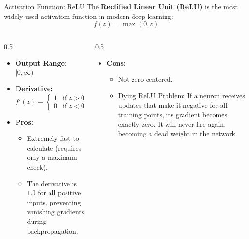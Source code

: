 \documentclass[9pt]{beamer}
\begin{document}
\begin{frame}{Activation Function: ReLU}
  The \textbf{Rectified Linear Unit (ReLU)} is the most widely used activation function in modern deep learning:
  $$f(z) = \max(0, z)$$
  \begin{columns}
    \begin{column}{0.5\textwidth}
      \begin{itemize}
        \item \textbf{Output Range:} $[0, \infty)$
        \item \textbf{Derivative:}
          $$f'(z) = \begin{cases} 1 & \text{if } z > 0 \\ 0 & \text{if } z < 0 \end{cases}$$
        \item \textbf{Pros:}
          \begin{itemize}
            \item Extremely fast to calculate (requires only a maximum check).
            \item The derivative is $1.0$ for all positive inputs, preventing vanishing gradients during backpropagation.
          \end{itemize}
      \end{itemize}
    \end{column}
    \begin{column}{0.5\textwidth}
      \begin{itemize}
        \item \textbf{Cons:}
          \begin{itemize}
            \item Not zero-centered.
            \item \alert{Dying ReLU Problem:} If a neuron receives updates that make it negative for all training points, its gradient becomes exactly zero. It will never fire again, becoming a dead weight in the network.
          \end{itemize}
      \end{itemize}
    \end{column}
  \end{columns}
\end{frame}
\end{document}
